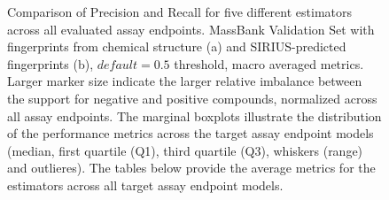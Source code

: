 \begin{figure}
\begin{subfigure}[b]{0.495\textwidth}
      \caption{}
      \label{fig:hitcall_classification_Feature_Selection_XGBClassifier_mb_val_sirius_default_macro_avg}
  \end{subfigure}
  \caption{Comparison of Precision and Recall for five different estimators across all evaluated assay endpoints. MassBank Validation Set with fingerprints from chemical structure (a) and SIRIUS-predicted fingerprints (b), $default = 0.5$ threshold, macro averaged metrics. Larger marker size indicate the larger relative imbalance between the support for negative and positive compounds, normalized across all assay endpoints. The marginal boxplots illustrate the distribution of the performance metrics across the target assay endpoint models (median, first quartile (Q1), third quartile (Q3), whiskers (range) and outlieres). The tables below provide the average metrics for the estimators across all target assay endpoint models.}
  \label{fig:hitcall_classification_Feature_Selection_XGBClassifier_mb_val_default_macro_avg}
\end{figure}





\newpage

